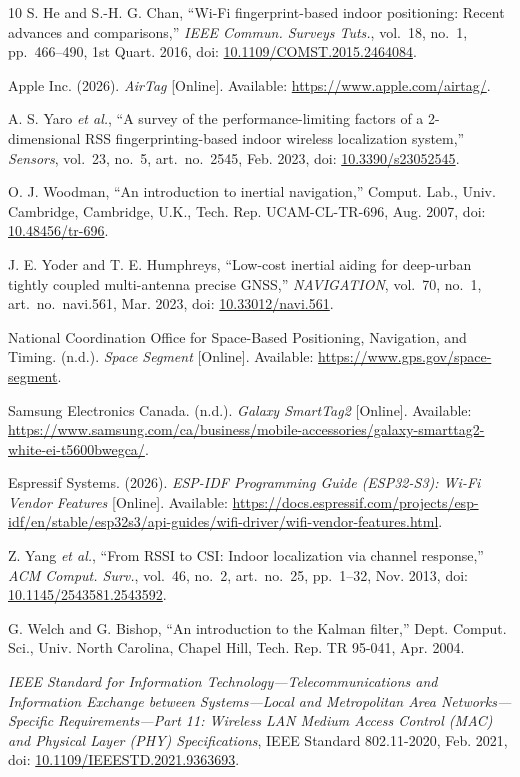 \documentclass[12pt,letterpaper]{article}
\begin{document}
\begin{thebibliography}{10}
S. He and S.-H. G. Chan, ``Wi-Fi fingerprint-based indoor positioning: Recent advances and
comparisons,'' \emph{IEEE Commun. Surveys Tuts.}, vol.~18, no.~1, pp.~466--490, 1st Quart. 2016,
doi: \url{10.1109/COMST.2015.2464084}.


Apple Inc. (2026). \emph{AirTag} [Online]. Available: \url{https://www.apple.com/airtag/}.


A. S. Yaro \emph{et al.}, ``A survey of the performance-limiting factors of a
2-dimensional RSS fingerprinting-based indoor wireless localization system,'' \emph{Sensors},
vol.~23, no.~5, art.~no.~2545, Feb. 2023, doi: \url{10.3390/s23052545}.


O. J. Woodman, ``An introduction to inertial navigation,'' Comput. Lab., Univ. Cambridge,
Cambridge, U.K., Tech. Rep. UCAM-CL-TR-696, Aug. 2007, doi: \url{10.48456/tr-696}.


J. E. Yoder and T. E. Humphreys, ``Low-cost inertial aiding for deep-urban tightly coupled
multi-antenna precise GNSS,'' \emph{NAVIGATION}, vol.~70, no.~1, art.~no.~navi.561, Mar. 2023,
doi: \url{10.33012/navi.561}.


National Coordination Office for Space-Based Positioning, Navigation, and Timing. (n.d.).
\emph{Space Segment} [Online]. Available: \url{https://www.gps.gov/space-segment}.


Samsung Electronics Canada. (n.d.). \emph{Galaxy SmartTag2} [Online]. Available:
\url{https://www.samsung.com/ca/business/mobile-accessories/galaxy-smarttag2-white-ei-t5600bwegca/}.


Espressif Systems. (2026). \emph{ESP-IDF Programming Guide (ESP32-S3): Wi-Fi Vendor Features}
[Online]. Available:
\url{https://docs.espressif.com/projects/esp-idf/en/stable/esp32s3/api-guides/wifi-driver/wifi-vendor-features.html}.


Z. Yang \emph{et al.}, ``From RSSI to CSI: Indoor localization via channel response,''
\emph{ACM Comput. Surv.}, vol.~46, no.~2, art.~no.~25, pp.~1--32, Nov. 2013,
doi: \url{10.1145/2543581.2543592}.


G. Welch and G. Bishop, ``An introduction to the Kalman filter,'' Dept. Comput. Sci., Univ. North
Carolina, Chapel Hill, Tech. Rep. TR 95-041, Apr. 2004.


\emph{IEEE Standard for Information Technology---Telecommunications and Information Exchange
between Systems---Local and Metropolitan Area Networks---Specific Requirements---Part 11:
Wireless LAN Medium Access Control (MAC) and Physical Layer (PHY) Specifications}, IEEE Standard
802.11-2020, Feb. 2021, doi: \url{10.1109/IEEESTD.2021.9363693}.



\end{thebibliography}
\end{document}
